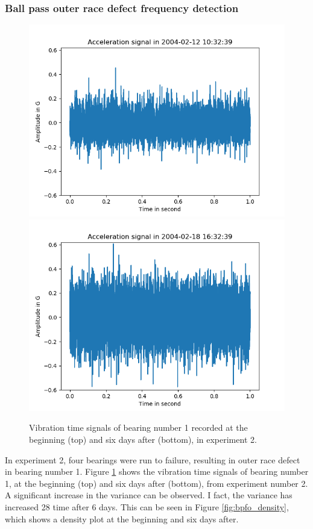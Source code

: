 \documentclass[../Main/thesis.tex]{subfiles}
\begin{document}
\subsubsection{Ball pass outer race defect frequency detection}
%
\begin{figure}[H]
	\centering
	\includegraphics[width=0.7\linewidth]{../fig/bpfo/first_day_signal_bpfo}
	\includegraphics[width=0.7\linewidth]{../fig/bpfo/last_day_signal_bpfo}
	\caption{Vibration time signals of bearing number 1 recorded at the beginning (top) and six days after (bottom), in experiment 2.}
	\label{fig:bpfo_signal}
\end{figure}
In experiment 2, four bearings were run to failure, resulting in outer race defect in bearing  number 1.
Figure \ref{fig:bpfo_signal} shows the vibration time signals of bearing number 1, at the beginning (top) and six days after (bottom), from experiment number 2. A significant increase in the variance can be observed.
I fact, the variance has increased 28 time after 6 days. This can be seen in Figure \ref{fig:bpfo_density}, which shows a density plot at the beginning and six days after.
\end{document}
